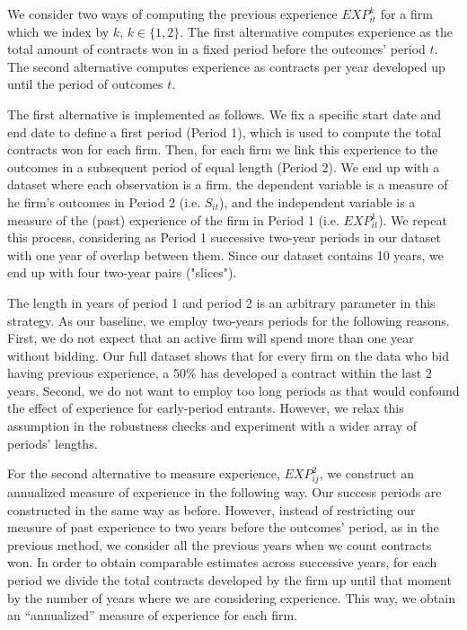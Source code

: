 We consider two ways of computing the previous experience $EXP^k_{it}$ for a firm which we index by $k$, $k\in \{1,2\}$. The first alternative computes experience as the total amount of contracts won in a fixed period before the outcomes' period $t$. The second alternative computes experience as contracts per year developed up until the period of outcomes $t$.

The first alternative is implemented as follows. We fix a specific start date and end date to define a first period (Period 1), which is used to compute the total contracts won for each firm. Then, for each firm we link this experience to the outcomes in a subsequent period of equal length (Period 2). We end up with a dataset where each observation is a firm, the dependent variable is a measure of he firm’s outcomes in Period 2 (i.e. $S_{it}$), and the independent variable is a measure of the (past) experience of the firm in Period 1 (i.e. $EXP^1_{it}$). We repeat this process, considering as Period 1 successive two-year periods in our dataset with one year of overlap between them. Since our dataset contains 10 years, we end up with four two-year pairs ("slices").

The length in years of period 1 and period 2 is an arbitrary parameter in this strategy. As our baseline, we employ two-years periods for the following reasons. First, we do not expect that an active firm will spend more than one year without bidding. Our full dataset shows that for every firm on the data who bid having previous experience, a 50\% has developed a contract within the last 2 years. Second, we do not want to employ too long periods as that would confound the effect of experience for early-period entrants. However, we relax this assumption in the robustness checks and experiment with a wider array of periods’ lengths.

For the second alternative to measure experience, $EXP^2_{ij}$, we construct an annualized measure of experience in the following way. Our success periods are constructed in the same way as before. However, instead of restricting our measure of past experience to two years before the outcomes' period, as in the previous method, we consider all the previous years when we count contracts won. In order to obtain comparable estimates across successive years, for each period we divide the total contracts developed by the firm up until that moment by the number of years where we are considering experience. This way, we obtain an “annualized” measure of experience for each firm.

